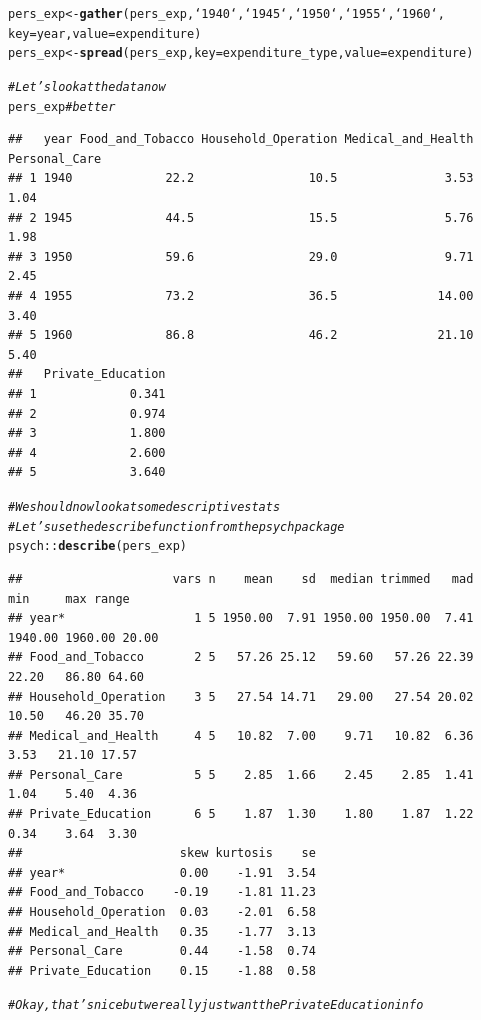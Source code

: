 \documentclass{article}\usepackage[]{graphicx}\usepackage[]{color}
\makeatletter
\newcommand{\hlcom}[1]{\textcolor[rgb]{0.678,0.584,0.686}{\textit{#1}}}%
\newcommand{\hlopt}[1]{\textcolor[rgb]{0,0,0}{#1}}%
\newcommand{\hlstd}[1]{\textcolor[rgb]{0.345,0.345,0.345}{#1}}%
\newcommand{\hlkwb}[1]{\textcolor[rgb]{0.69,0.353,0.396}{#1}}%
\newcommand{\hlkwc}[1]{\textcolor[rgb]{0.333,0.667,0.333}{#1}}%
\newcommand{\hlkwd}[1]{\textcolor[rgb]{0.737,0.353,0.396}{\textbf{#1}}}%
\newenvironment{kframe}{%
 \def\at@end@of@kframe{}%
 \ifinner\ifhmode%
  \def\at@end@of@kframe{\end{minipage}}%
  \begin{minipage}{\columnwidth}%
 \fi\fi%
 \def\FrameCommand##1{\hskip\@totalleftmargin \hskip-\fboxsep
 \colorbox{shadecolor}{##1}\hskip-\fboxsep
     \hskip-\linewidth \hskip-\@totalleftmargin \hskip\columnwidth}%
 \MakeFramed {\advance\hsize-\width
   \@totalleftmargin\z@ \linewidth\hsize
   \@setminipage}}%
 {\par\unskip\endMakeFramed%
 \at@end@of@kframe}
\newenvironment{knitrout}{}{} %
\makeatother
\begin{document}
\begin{knitrout}
\begin{kframe}
\begin{alltt}
\hlstd{pers_exp} \hlkwb{<-} \hlkwd{gather}\hlstd{( pers_exp , `1940` , `1945` , `1950` , `1955` , `1960` ,}
        \hlkwc{key} \hlstd{= year,} \hlkwc{value} \hlstd{=  expenditure)}
\hlstd{pers_exp} \hlkwb{<-} \hlkwd{spread}\hlstd{( pers_exp ,} \hlkwc{key} \hlstd{= expenditure_type ,} \hlkwc{value} \hlstd{= expenditure)}

\hlcom{# Let's look at the data now}
\hlstd{pers_exp}        \hlcom{#better}
\end{alltt}
\begin{verbatim}
##   year Food_and_Tobacco Household_Operation Medical_and_Health Personal_Care
## 1 1940             22.2                10.5               3.53          1.04
## 2 1945             44.5                15.5               5.76          1.98
## 3 1950             59.6                29.0               9.71          2.45
## 4 1955             73.2                36.5              14.00          3.40
## 5 1960             86.8                46.2              21.10          5.40
##   Private_Education
## 1             0.341
## 2             0.974
## 3             1.800
## 4             2.600
## 5             3.640
\end{verbatim}
\begin{alltt}
\hlcom{# We should now look at some descriptive stats}
\hlcom{# Let's use the describe function from the psych package}
\hlstd{psych}\hlopt{::}\hlkwd{describe}\hlstd{(pers_exp)}
\end{alltt}
\begin{verbatim}
##                     vars n    mean    sd  median trimmed   mad     min     max range
## year*                  1 5 1950.00  7.91 1950.00 1950.00  7.41 1940.00 1960.00 20.00
## Food_and_Tobacco       2 5   57.26 25.12   59.60   57.26 22.39   22.20   86.80 64.60
## Household_Operation    3 5   27.54 14.71   29.00   27.54 20.02   10.50   46.20 35.70
## Medical_and_Health     4 5   10.82  7.00    9.71   10.82  6.36    3.53   21.10 17.57
## Personal_Care          5 5    2.85  1.66    2.45    2.85  1.41    1.04    5.40  4.36
## Private_Education      6 5    1.87  1.30    1.80    1.87  1.22    0.34    3.64  3.30
##                      skew kurtosis    se
## year*                0.00    -1.91  3.54
## Food_and_Tobacco    -0.19    -1.81 11.23
## Household_Operation  0.03    -2.01  6.58
## Medical_and_Health   0.35    -1.77  3.13
## Personal_Care        0.44    -1.58  0.74
## Private_Education    0.15    -1.88  0.58
\end{verbatim}
\begin{alltt}
\hlcom{# Okay, that's nice but we really just want the Private Education info}


\end{alltt}
\end{kframe}
\end{knitrout}
\end{document}
